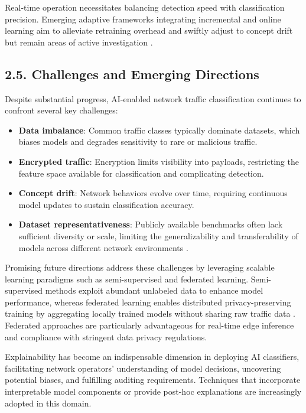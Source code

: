 \documentclass[11pt]{article}
\begin{document}
\begin{itemize}
Real-time operation necessitates balancing detection speed with classification precision. Emerging adaptive frameworks integrating incremental and online learning aim to alleviate retraining overhead and swiftly adjust to concept drift but remain areas of active investigation \cite{ref51}.

\subsection{2.5. Challenges and Emerging Directions}

Despite substantial progress, AI-enabled network traffic classification continues to confront several key challenges:

\begin{itemize}
    \item \textbf{Data imbalance}: Common traffic classes typically dominate datasets, which biases models and degrades sensitivity to rare or malicious traffic.
    \item \textbf{Encrypted traffic}: Encryption limits visibility into payloads, restricting the feature space available for classification and complicating detection.
    \item \textbf{Concept drift}: Network behaviors evolve over time, requiring continuous model updates to sustain classification accuracy.
    \item \textbf{Dataset representativeness}: Publicly available benchmarks often lack sufficient diversity or scale, limiting the generalizability and transferability of models across different network environments \cite{ref51}.
\end{itemize}

Promising future directions address these challenges by leveraging scalable learning paradigms such as semi-supervised and federated learning. Semi-supervised methods exploit abundant unlabeled data to enhance model performance, whereas federated learning enables distributed privacy-preserving training by aggregating locally trained models without sharing raw traffic data \cite{ref49,ref50,ref51}. Federated approaches are particularly advantageous for real-time edge inference and compliance with stringent data privacy regulations.

Explainability has become an indispensable dimension in deploying AI classifiers, facilitating network operators' understanding of model decisions, uncovering potential biases, and fulfilling auditing requirements. Techniques that incorporate interpretable model components or provide post-hoc explanations are increasingly adopted in this domain.


\end{itemize}
\end{document}
